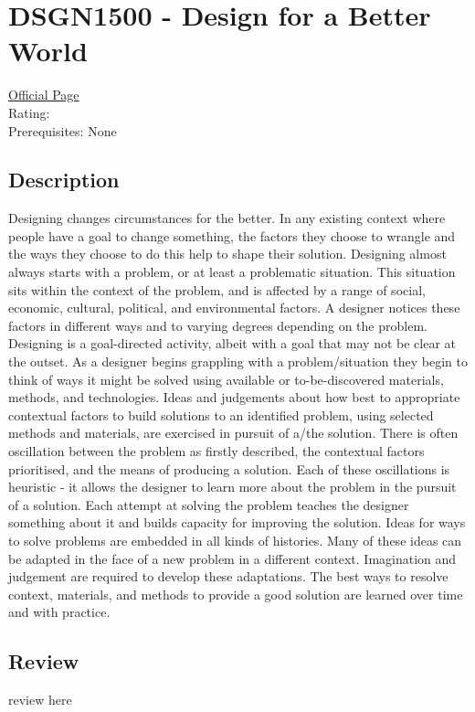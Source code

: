 \hypertarget{DSGN1500}{\section{DSGN1500 - Design for a Better World}}

\large
\textcolor{turbo_purple}{\href{https://my.uq.edu.au/programs-courses/course.html?course_code=DSGN1500}{Official Page}} \\
Rating: \cstar\cstar\cstar\cstar\ostar \\
Prerequisites: None

\normalsize
\subsection*{Description}
Designing changes circumstances for the better. In any existing context where people have a goal to change something, the factors they choose to wrangle and the ways they choose to do this help to shape their solution.
Designing almost always starts with a problem, or at least a problematic situation.
This situation sits within the context of the problem, and is affected by a range of social, economic, cultural, political, and environmental factors.
A designer notices these factors in different ways and to varying degrees depending on the problem.
Designing is a goal-directed activity, albeit with a goal that may not be clear at the outset.
As a designer begins grappling with a problem/situation they begin to think of ways it might be solved using available or to-be-discovered materials, methods, and technologies.
Ideas and judgements about how best to appropriate contextual factors to build solutions to an identified problem, using selected methods and materials, are exercised in pursuit of a/the solution.
There is often oscillation between the problem as firstly described, the contextual factors prioritised, and the means of producing a solution. Each of these oscillations is heuristic - it allows the designer to learn more about the problem in the pursuit of a solution.
Each attempt at solving the problem teaches the designer something about it and builds capacity for improving the solution.
Ideas for ways to solve problems are embedded in all kinds of histories.
Many of these ideas can be adapted in the face of a new problem in a different context.
Imagination and judgement are required to develop these adaptations.
The best ways to resolve context, materials, and methods to provide a good solution are learned over time and with practice.

\subsection*{Review}
review here
